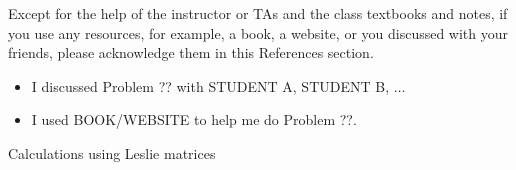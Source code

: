 \documentclass[addpoints, 11pt]{exam}
\begin{document}
 Except for the help of the instructor or TAs and the class textbooks and notes, if you use any resources, for example, a book, a website, or you discussed with your friends, please acknowledge them in this References section. 
\begin{itemize}
\item I discussed Problem ?? with STUDENT A, STUDENT B, $\ldots$
\item I used BOOK/WEBSITE to help me do Problem ??.
\end{itemize}
\vspace{.05cm}
\begin{questions}
\question Calculations using Leslie matrices
\begin{parts}

\end{parts}
\end{questions}
\end{document}
